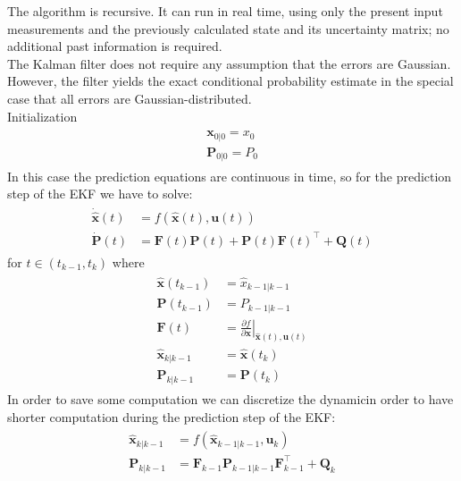   The algorithm is recursive. It can run in real time, using only the present input measurements and the previously calculated state and its uncertainty matrix; no additional past information is required.\\
The Kalman filter does not require any assumption that the errors are Gaussian. However, the filter yields the exact conditional probability estimate in the special case that all errors are Gaussian-distributed.\\
Initialization
\begin{align}
\begin{split}
\boldsymbol{x}_{0|0} = x_0\\
\boldsymbol{P}_{0|0} = P_0
\end{split}
\end{align}
In this case the prediction equations are continuous in time, so for the prediction step of the EKF we have to solve:
\begin{align}
\begin{split}
\boldsymbol{\dot{\hat{x}}}(t) &= f(\boldsymbol{\hat{x}}(t),\boldsymbol{u}(t)) \\
\boldsymbol{\dot{P}}(t) &= \boldsymbol{F}(t) \boldsymbol{P}(t) + \boldsymbol{P}(t)\boldsymbol{F}(t)^{\top } + \boldsymbol{Q}(t)
\end{split}
\end{align}
for $t \in (t_{k-1}, t_k)$ where %
\begin{align}
\begin{split}
\boldsymbol{\hat{x}}(t_{k-1}) &= \hat{x}_{k-1|k-1} \\
\boldsymbol{P}(t_{k-1}) &= P_{k-1|k-1}
\\
{\boldsymbol{F}}(t)&=\left.{\frac  {\partial f}{\partial {\boldsymbol{x}}}}\right\vert _{{{\hat  {{\boldsymbol{x}}}}(t),{\boldsymbol{u}}(t)}}  \\
\boldsymbol{\hat{x}}_{k|k-1} &= \boldsymbol{\hat{x}}(t_{k}) \\
\boldsymbol{P}_{k|k-1} &= \boldsymbol{P}(t_{k})
\end{split}
\end{align}
In order to save some computation we can discretize the dynamicin order to have shorter computation during the prediction step of the EKF:
\begin{align}
\begin{split}
\boldsymbol{\hat{x}}_{k|k-1} &= f(\boldsymbol{\hat{x}}_{k-1|k-1},\boldsymbol{u}_k) \\
\boldsymbol{P}_{k|k-1} &= \boldsymbol{F}_{k-1} \boldsymbol{P}_{k-1|k-1}\boldsymbol{F}_{k-1}^{\top } + \boldsymbol{Q}_{k}
\end{split}
\end{align}
